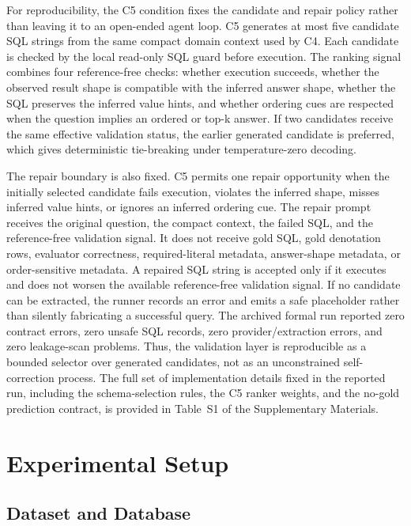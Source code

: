 \documentclass{article}
\begin{document}
For reproducibility, the C5 condition fixes the candidate and repair policy rather than leaving it to an open-ended agent loop. C5 generates at most five candidate SQL strings from the same compact domain context used by C4. Each candidate is checked by the local read-only SQL guard before execution. The ranking signal combines four reference-free checks: whether execution succeeds, whether the observed result shape is compatible with the inferred answer shape, whether the SQL preserves the inferred value hints, and whether ordering cues are respected when the question implies an ordered or top-k answer. If two candidates receive the same effective validation status, the earlier generated candidate is preferred, which gives deterministic tie-breaking under temperature-zero decoding.

The repair boundary is also fixed. C5 permits one repair opportunity when the initially selected candidate fails execution, violates the inferred shape, misses inferred value hints, or ignores an inferred ordering cue. The repair prompt receives the original question, the compact context, the failed SQL, and the reference-free validation signal. It does not receive gold SQL, gold denotation rows, evaluator correctness, required-literal metadata, answer-shape metadata, or order-sensitive metadata. A repaired SQL string is accepted only if it executes and does not worsen the available reference-free validation signal. If no candidate can be extracted, the runner records an error and emits a safe placeholder rather than silently fabricating a successful query. The archived formal run reported zero contract errors, zero unsafe SQL records, zero provider/extraction errors, and zero leakage-scan problems. Thus, the validation layer is reproducible as a bounded selector over generated candidates, not as an unconstrained self-correction process. The full set of implementation details fixed in the reported run, including the schema-selection rules, the C5 ranker weights, and the no-gold prediction contract, is provided in Table~S1 of the Supplementary Materials.

\section{Experimental Setup}\label{experiments}

\subsection{Dataset and Database}\label{sect:e1}
\end{document}
